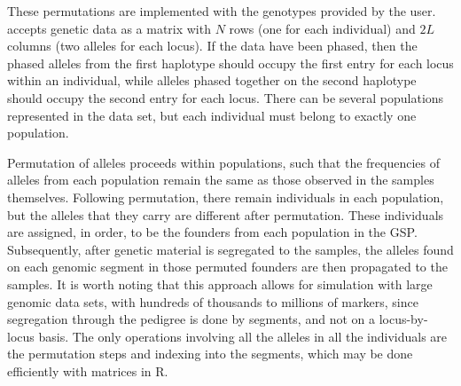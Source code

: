 


These permutations are implemented with the genotypes provided by the user.
\gscramble{} accepts genetic data as a matrix with $N$ rows (one for each individual) and
$2L$ columns (two alleles for each locus). If the data have been phased, then the phased alleles from the
first haplotype should occupy the
first entry for each locus within an individual, while alleles phased together on the second haplotype should occupy the
second entry for each locus.
There can be several populations represented in the data set, but
each individual must belong to exactly one
population.

Permutation of alleles proceeds within populations, such that
the frequencies of alleles from each population remain the same as those observed
in the samples themselves. Following permutation, there remain individuals
in each population, but the alleles that they carry are different after permutation.  These
individuals are assigned, in order, to be the founders from each population in the GSP. Subsequently,
after genetic material is segregated to the samples, the alleles found on each genomic segment in those permuted
founders are then propagated to the samples.  It is worth noting that this approach allows for simulation
with large genomic data sets, with hundreds of thousands to millions of markers, since segregation
through the pedigree is done by segments, and not on a locus-by-locus basis. The only operations
involving all the alleles in all the individuals are the permutation steps and indexing into the segments,
which may be done efficiently with matrices in R.

